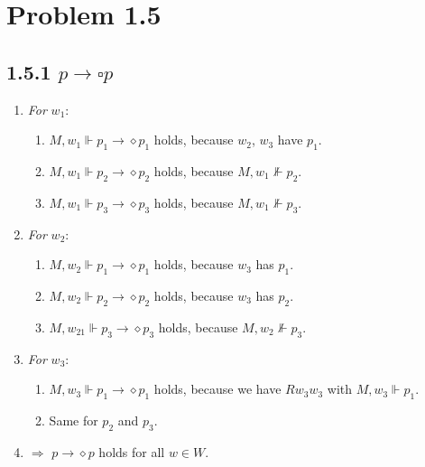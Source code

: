 \documentclass{report}
\begin{document}
	\section*{Problem 1.5}
		\subsection*{1.5.1 $p \rightarrow \square p$}
		\begin{enumerate}[]
			\item \textit{For} $w_1$:
			\begin{enumerate}[]
				\item $M, w_1 \Vdash p_1 \rightarrow \diamond p_1$ holds, because $w_2$, $w_3$ have $p_1$.
				\item $M, w_1 \Vdash p_2 \rightarrow \diamond p_2$ holds, because $M, w_1 \not \Vdash p_2$.
				\item $M, w_1 \Vdash p_3 \rightarrow \diamond p_3$ holds, because $M, w_1 \not \Vdash p_3$.
			\end{enumerate}
			\item \textit{For} $w_2$:
			\begin{enumerate}[]
				\item $M, w_2 \Vdash p_1 \rightarrow \diamond p_1$ holds, because $w_3$ has $p_1$.
				\item $M, w_2 \Vdash p_2 \rightarrow \diamond p_2$ holds, because $w_3$ has $p_2$.
				\item $M, w_21 \Vdash p_3 \rightarrow \diamond p_3$ holds, because $M, w_2 \not \Vdash p_3$.
			\end{enumerate}
			\item \textit{For} $w_3$:
			\begin{enumerate}[]
				\item $M, w_3 \Vdash p_1 \rightarrow \diamond p_1$ holds, because we have $Rw_3w_3$ with $M, w_3 \Vdash p_1$.
				\item Same for $p_2$ and $p_3$.
			\end{enumerate}
			\item $\Rightarrow$ $p \rightarrow \diamond p$ holds for all $w \in W$. 
		\end{enumerate}
\end{document}
